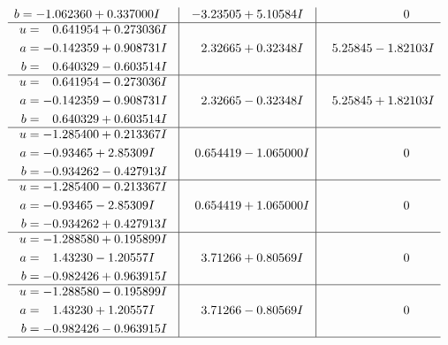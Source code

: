 \documentclass[1p]{elsarticle_modified}
\theoremstyle{definition}
\begin{document}
$$\begin{array}{c|c|c}
\begin{aligned}
b &= -1.062360 + 0.337000 I\end{aligned}
 & -3.23505 + 5.10584 I & \phantom{-0.000000 } 0 \\ \hline\begin{aligned}
u &= \phantom{-}0.641954 + 0.273036 I \\
a &= -0.142359 + 0.908731 I \\
b &= \phantom{-}0.640329 - 0.603514 I\end{aligned}
 & \phantom{-}2.32665 + 0.32348 I & \phantom{-}5.25845 - 1.82103 I \\ \hline\begin{aligned}
u &= \phantom{-}0.641954 - 0.273036 I \\
a &= -0.142359 - 0.908731 I \\
b &= \phantom{-}0.640329 + 0.603514 I\end{aligned}
 & \phantom{-}2.32665 - 0.32348 I & \phantom{-}5.25845 + 1.82103 I \\ \hline\begin{aligned}
u &= -1.285400 + 0.213367 I \\
a &= -0.93465 + 2.85309 I \\
b &= -0.934262 - 0.427913 I\end{aligned}
 & \phantom{-}0.654419 - 1.065000 I & \phantom{-0.000000 } 0 \\ \hline\begin{aligned}
u &= -1.285400 - 0.213367 I \\
a &= -0.93465 - 2.85309 I \\
b &= -0.934262 + 0.427913 I\end{aligned}
 & \phantom{-}0.654419 + 1.065000 I & \phantom{-0.000000 } 0 \\ \hline\begin{aligned}
u &= -1.288580 + 0.195899 I \\
a &= \phantom{-}1.43230 - 1.20557 I \\
b &= -0.982426 + 0.963915 I\end{aligned}
 & \phantom{-}3.71266 + 0.80569 I & \phantom{-0.000000 } 0 \\ \hline\begin{aligned}
u &= -1.288580 - 0.195899 I \\
a &= \phantom{-}1.43230 + 1.20557 I \\
b &= -0.982426 - 0.963915 I\end{aligned}
 & \phantom{-}3.71266 - 0.80569 I & \phantom{-0.000000 } 0\\
 \hline 
 \end{array}$$\newpage$$\begin{array}{c|c|c}  

\end{array}$$
\end{document}
